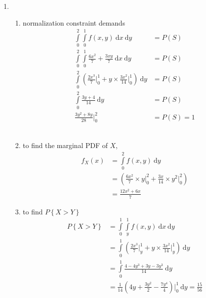 \begin{enumerate}
	\item 
	\begin{enumerate}
		
			\item 
			normalization constraint demands \\
			\begin{align}
				\int\limits_{0}^{2} \int\limits_{0}^{1} f(x, y)\ \mathrm{d}x \ \mathrm{d}y &= P(S) \nonumber \\
				\int\limits_{0}^{2} \int\limits_{0}^{1} \frac{6x^2}{7} + \frac{3xy}{7}\ \mathrm{d}x \ \mathrm{d}y &= P(S) \nonumber\\
				\int\limits_{0}^{2} \left(\frac{2x^3}{7} \Big|_0^1 + y \times \frac{3x^2}{14} \Big|_0^1  \right) \ \mathrm{d}y &= P(S) \nonumber \\
				\int\limits_{0}^{2} \frac{3y + 4}{14}\ \mathrm{d}y &= P(S) \nonumber \\
				\frac{3y^2 + 8y}{28} \Big|_0^2 &= P(S) = 1
			\end{align}\\
			
			\item to find the marginal PDF of $ X $, \\
			\begin{align}
				f_X (x) &= \int\limits_{0}^{2} f(x, y)\ \mathrm{d}y \nonumber \\
				&= \left( \frac{6x^2}{7} \times y \Big|_0^2 + \frac{3x}{14} \times y^2 \Big|_0^2  \right) \nonumber \\
				&= \frac{12x^2 + 6x}{7}
			\end{align}
			
			\item to find $ P \left\{ X > Y \right\} $\\
			
			\begin{align}
				P\left\{ X > Y\right\} &= \int\limits_{0}^{1} \int\limits_{y}^{1} f(x, y)\ \mathrm{d}x \ \mathrm{d}y \nonumber \\
				&= \int\limits_{0}^{1} \left(\frac{2x^3}{7} \Big|_y^1 + y \times \frac{3x^2}{14} \Big|_y^1  \right) \ \mathrm{d}y  \nonumber \\
				&= \int\limits_{0}^{1} \frac{4 - 4y^3 + 3y - 3y^3}{14} \ \mathrm{d}y  \nonumber \\
				&= \frac{1}{14} \left( 4y + \frac{3y^2}{2} - \frac{7y^4}{4} \right)\Big|_0^1 \ \mathrm{d}y  = \frac{15}{56}
			\end{align}\\
			

\end{enumerate}
\end{enumerate}
